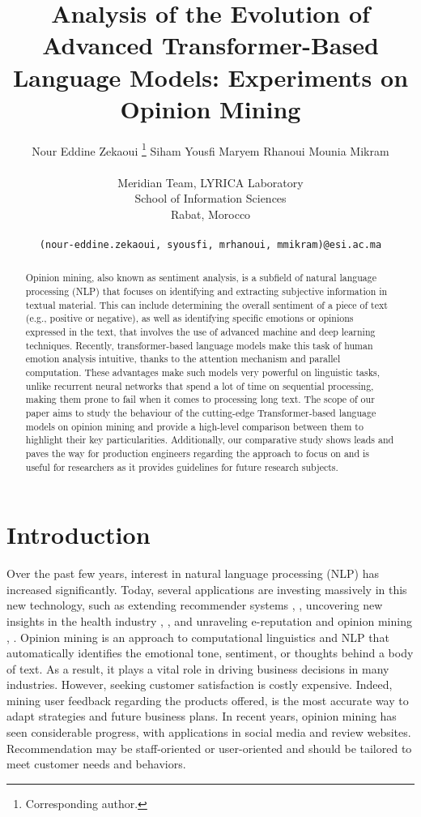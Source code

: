 \documentclass{article}
\title{Analysis of the Evolution of Advanced Transformer-Based Language Models: Experiments on Opinion Mining}
\author{Nour Eddine Zekaoui \thanks{Corresponding author.} \hspace{1.0cm} Siham Yousfi \hspace{1.0cm} Maryem Rhanoui \hspace{1.0cm} Mounia Mikram \\ \\
  Meridian Team, LYRICA Laboratory\\
  School of Information Sciences\\
  Rabat, Morocco \\ \\
  \texttt{(nour-eddine.zekaoui, syousfi, mrhanoui, mmikram)@esi.ac.ma} \\
}
\begin{document}
\maketitle
\begin{abstract}
Opinion mining, also known as sentiment analysis, is a subfield of natural language processing (NLP) that focuses on identifying and extracting subjective information in textual material. This can include determining the overall sentiment of a piece of text (e.g., positive or negative), as well as identifying specific emotions or opinions expressed in the text, that involves the use of advanced machine and deep learning techniques. Recently, transformer-based language models make this task of human emotion analysis intuitive, thanks to the attention mechanism and parallel computation. These advantages make such models very powerful on linguistic tasks, unlike recurrent neural networks that spend a lot of time on sequential processing, making them prone to fail when it comes to processing long text. The scope of our paper aims to study the behaviour of the cutting-edge Transformer-based language models on opinion mining and provide a high-level comparison between them to highlight their key particularities. Additionally, our comparative study shows leads and paves the way for production engineers regarding the approach to focus on and is useful for researchers as it provides guidelines for future research subjects.
\end{abstract}





\section{Introduction}
Over the past few years, interest in natural language processing (NLP) \cite{chowdhary2020natural} has increased significantly. Today, several applications are investing massively in this new technology, such as extending recommender systems \cite{rhanoui2020hybrid}, \cite{trabelsi2021hybrid}, uncovering new insights in the health industry \cite{pandey2021comprehensive}, \cite{harnoune2021bert}, and unraveling e-reputation and opinion mining \cite{medhat2014sentiment}, \cite{sun2017review}. Opinion mining is an approach to computational linguistics and NLP that automatically identifies the emotional tone, sentiment, or thoughts behind a body of text. As a result, it plays a vital role in driving business decisions in many industries. However, seeking customer satisfaction is costly expensive. Indeed, mining user feedback regarding the products offered, is the most accurate way to adapt strategies and future business plans. In recent years, opinion mining has seen considerable progress, with applications in social media and review websites. Recommendation may be staff-oriented \cite{rhanoui2020hybrid} or user-oriented \cite{yousfi2017mixed} and should be tailored to meet customer needs and behaviors.
\end{document}
